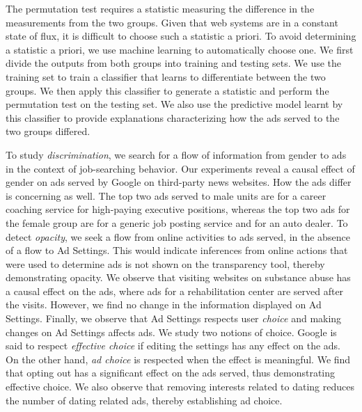 \documentclass[10pt, onecolumn]{report}
\begin{document}
The permutation test requires a statistic measuring the difference in the
measurements from the two groups. Given that web systems are in a constant state of
flux, it is difficult to choose such a statistic a priori. 
To avoid determining a statistic a priori, we use 
machine learning to automatically choose one. 
We first divide the outputs from both groups into training and testing sets. We use 
the training set to train a classifier that learns to
differentiate between the two groups. We then apply this classifier to generate a statistic 
and perform the permutation test on the testing set. 
We also use the predictive model learnt by this classifier to provide explanations
characterizing how the ads served to the two groups differed.

To study \emph{discrimination}, we search for a flow of 
information from gender to ads in the context of job-searching behavior. 
Our experiments reveal a causal effect of gender on  
ads served by Google on third-party news websites. How the ads differ is 
concerning as well. The top two ads served to male units are for a 
career coaching service for high-paying executive positions, 
whereas the top two ads for the female group are for a generic job posting 
service and for an auto dealer. 
To detect \emph{opacity}, we seek a flow from online activities
to ads served, in the absence of a flow to Ad Settings. 
This would indicate inferences from online actions that were used to determine 
ads is not shown on the transparency tool, thereby demonstrating opacity. 
We observe that visiting websites on substance abuse 
has a causal effect on the ads, where ads for a 
rehabilitation center are served after the visits. 
However, we find no change in the information displayed on Ad Settings.
Finally, we observe that Ad Settings respects  
user \emph{choice} and making changes on Ad Settings affects ads. We study
two notions of choice. Google is said to respect \emph{effective choice} if
editing the settings has any effect on the ads. On the other hand, \emph{ad choice}
is respected when the effect is meaningful. We find that opting out has a significant 
effect on the ads served, thus demonstrating effective choice. We also observe that 
removing interests related to dating reduces the number of dating related ads, 
thereby establishing ad choice.
\end{document}
